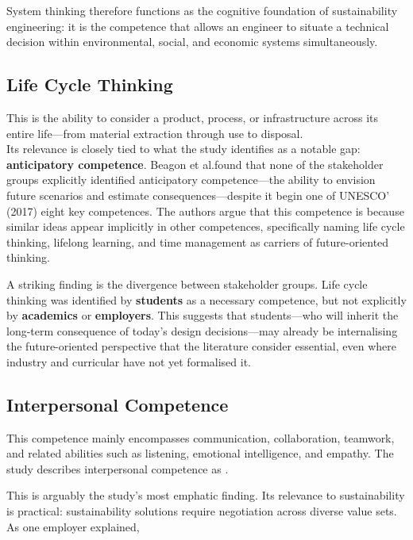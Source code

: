 \documentclass[11pt, a4paper]{article}
\begin{document}
System thinking therefore functions as the cognitive foundation of sustainability engineering: it is the competence that allows an engineer to situate a technical decision within environmental, social, and economic systems simultaneously.

\subsection{Life Cycle Thinking}
This is the ability to consider a product, process, or infrastructure across its entire life---from
material extraction through use to disposal.\\

Its relevance is closely tied to what the study identifies as a notable gap:
\textbf{anticipatory competence}. Beagon et al.found that none of the stakeholder groups explicitly identified anticipatory competence---the ability to envision future scenarios and estimate
consequences---despite it begin one of UNESCO' (2017) eight key competences. The authors argue that
this competence is  because similar ideas appear implicitly in other
competences, specifically naming life cycle thinking, lifelong learning, and time management as
carriers of future-oriented thinking.

A striking finding is the divergence between stakeholder groups. Life cycle thinking was identified by
\textbf{students} as a necessary competence, but not explicitly by \textbf{academics} or
\textbf{employers}. This suggests that students---who will inherit the long-term consequence of today's
design decisions---may already be internalising the future-oriented perspective that the literature
consider essential, even where industry and curricular have not yet formalised it.

\subsection{Interpersonal Competence}
This competence mainly encompasses communication, collaboration, teamwork, and related abilities such
as listening, emotional intelligence, and empathy. The study describes interpersonal competence as
.


\newpage
This is arguably the study's most emphatic finding. Its relevance to sustainability is practical:
sustainability solutions require negotiation across diverse value sets. As one employer explained,
\end{document}
